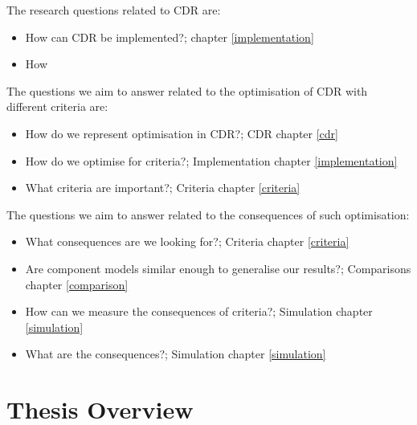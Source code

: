 The research questions related to CDR are:
\begin{itemize}
  \item How can CDR be implemented?; chapter \ref{implementation}
  \item How
\end{itemize}

The questions we aim to answer related to the optimisation of CDR with different criteria are:
\begin{itemize}
	\item How do we represent optimisation in CDR?; CDR chapter \ref{cdr}
	\item How do we optimise for criteria?; Implementation chapter \ref{implementation}
	\item What criteria are important?; Criteria chapter \ref{criteria}
\end{itemize}

The questions we aim to answer related to the consequences of such optimisation:
\begin{itemize}
	\item What consequences are we looking for?; Criteria chapter \ref{criteria}
	\item Are component models  similar enough to generalise our results?; Comparisons chapter \ref{comparison}
	\item How can we measure the consequences of criteria?; Simulation chapter \ref{simulation}
	\item What are the consequences?; Simulation chapter \ref{simulation}
\end{itemize}

\section{Thesis Overview}
